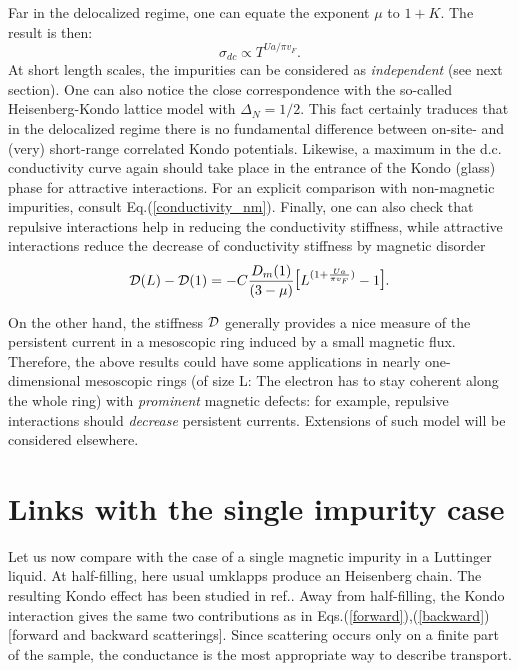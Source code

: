 Far in the delocalized regime, one can equate the exponent $\mu$ to 
$1+K$. The result is then:
\begin{equation}
\sigma_{dc}\propto T^{Ua/\pi v_F}.
\end{equation}
At short length scales, the impurities can be
considered as \emph{independent} (see next section).
One can also notice
the close correspondence with the so-called Heisenberg-Kondo
lattice model with $\Delta_N=1/2$. This fact certainly
traduces that in the delocalized regime
there is no fundamental difference between
on-site- and (very) short-range correlated Kondo potentials.
Likewise, a maximum in the d.c. conductivity curve again should take place in 
the
entrance of the Kondo (glass) phase for attractive
interactions. For an explicit comparison with non-magnetic impurities, consult
Eq.(\ref{conductivity_nm}). Finally, one can also check that repulsive
interactions help in reducing the conductivity stiffness, while attractive
interactions reduce the decrease of conductivity stiffness by magnetic
disorder
\begin{equation}
{\cal D}(L)-{\cal D}(1)=-C\frac{D_m(1)}{(3-\mu)}\hbox{\Large[}
L^{(1+\frac{Ua}{\pi v_F})}-1\hbox{\Large]}.
\end{equation}

On the other hand, the stiffness ${\cal D}$ generally
provides a nice measure of the persistent current in a mesoscopic ring 
induced by a small magnetic flux\cite{Buttiker}.
Therefore, the above results could have some applications in nearly
one-dimensional mesoscopic rings (of size L: The electron has to stay coherent
along the whole ring)
with \emph{prominent} magnetic defects: for
example, repulsive interactions should {\it decrease} persistent currents.
Extensions of such model will be considered elsewhere.

\section{Links with the single impurity case}

Let us now compare with the case of a single magnetic impurity in
a Luttinger liquid. At half-filling, here
usual umklapps produce an Heisenberg chain. The
resulting Kondo effect has been studied in ref.\cite{Eggert}. Away from
half-filling, the Kondo
interaction gives the same two 
contributions as in Eqs.(\ref{forward}),(\ref{backward}) [forward
and backward scatterings].
Since scattering occurs only on a
finite part of the sample, the conductance is the most appropriate way to
describe transport. 

